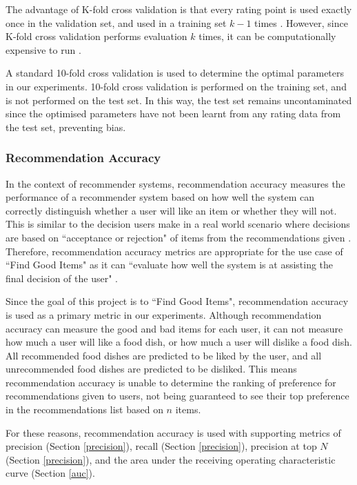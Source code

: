 The advantage of K-fold cross validation is that every rating point is used exactly once in the validation set, and used in a training set $k-1$ times \cite{kfold}. However, since K-fold cross validation performs evaluation $k$ times, it can be computationally expensive to run \cite{kfold}.

A standard 10-fold cross validation is used to determine the optimal parameters in our experiments. 10-fold cross validation is performed on the training set, and is not performed on the test set. In this way, the test set remains uncontaminated since the optimised parameters have not been learnt from any rating data from the test set, preventing bias.

\subsubsection{Recommendation Accuracy} \label{accuracy}

In the context of recommender systems, recommendation accuracy measures the performance of a recommender system based on how well the system can correctly distinguish whether a user will like an item or whether they will not. This is similar to the decision users make in a real world scenario where decisions are based on ``acceptance or rejection" of items from the recommendations given \cite{zhang}. Therefore, recommendation accuracy metrics are appropriate for the use case of ``Find Good Items" \cite{evaluation} as it can ``evaluate how well the system is at assisting the final decision of the user" \cite{zhang}. 

Since the goal of this project is to ``Find Good Items", recommendation accuracy is used as a primary metric in our experiments. Although recommendation accuracy can measure the good and bad items for each user, it can not measure how much a user will like a food dish, or how much a user will dislike a food dish. All recommended food dishes are predicted to be liked by the user, and all unrecommended food dishes are predicted to be disliked. This means recommendation accuracy is unable to determine the ranking of preference for recommendations given to users, not being guaranteed to see their top preference in the recommendations list based on $n$ items. 

For these reasons, recommendation accuracy is used with supporting metrics of precision (Section \ref{precision}), recall (Section \ref{precision}), precision at top $N$ (Section \ref{precision}), and the area under the receiving operating characteristic curve (Section \ref{auc}). 

